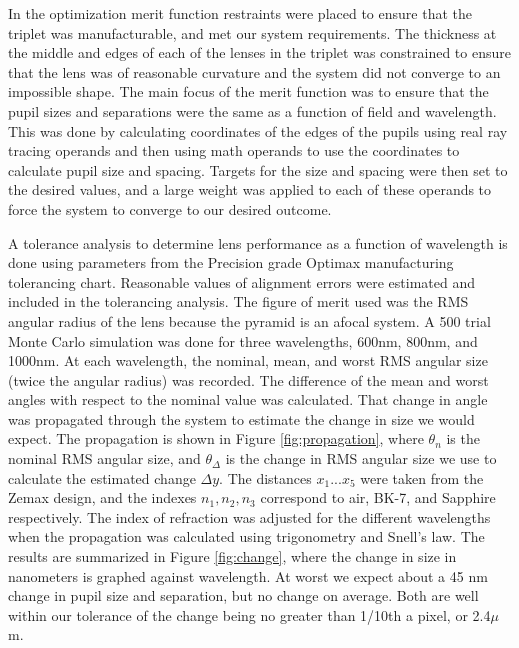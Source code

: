 In the optimization merit function restraints were placed to ensure that the triplet was manufacturable, and met our system requirements. The thickness at the middle and edges of each of the lenses in the triplet was constrained to ensure that the lens was of reasonable curvature and the system did not converge to an impossible shape. The main focus of the merit function was to ensure that the pupil sizes and separations were the same as a function of field and wavelength. This was done by calculating coordinates of the edges of the pupils using real ray tracing operands and then using math operands to use the coordinates to calculate pupil size and spacing. Targets for the size and spacing were then set to the desired values, and a large weight was applied to each of these operands to force the system to converge to our desired outcome.


	
A tolerance analysis to determine lens performance as a function of wavelength is done using parameters from the Precision grade Optimax manufacturing tolerancing chart. Reasonable values of alignment errors were estimated and included in the tolerancing analysis. The figure of merit used was the RMS angular radius of the lens because the pyramid is an afocal system. A 500 trial Monte Carlo simulation was done for three wavelengths, 600nm, 800nm, and 1000nm. At each wavelength, the nominal, mean, and worst RMS angular size (twice the angular radius) was recorded. The difference of the mean and worst angles with respect to the nominal value was calculated. That change in angle was propagated through the system to estimate the change in size we would expect. The propagation is shown in Figure \ref{fig:propagation}, where $\theta_n$ is the nominal RMS angular size, and $\theta_\Delta$ is the change in RMS angular size we use to calculate the estimated change $\Delta y$. The distances $x_1 ... x_5$ were taken from the Zemax design, and the indexes $n_1, n_2, n_3$ correspond to air, BK-7, and Sapphire respectively. The index of refraction was adjusted for the different wavelengths when the propagation was calculated using trigonometry and Snell's law. The results are summarized in Figure \ref{fig:change}, where the change in size in nanometers is graphed against wavelength. At worst we expect about a 45 nm change in pupil size and separation, but no change on average. Both are well within our tolerance of the change being no greater than 1/10th a pixel, or 2.4$\mu$m.

